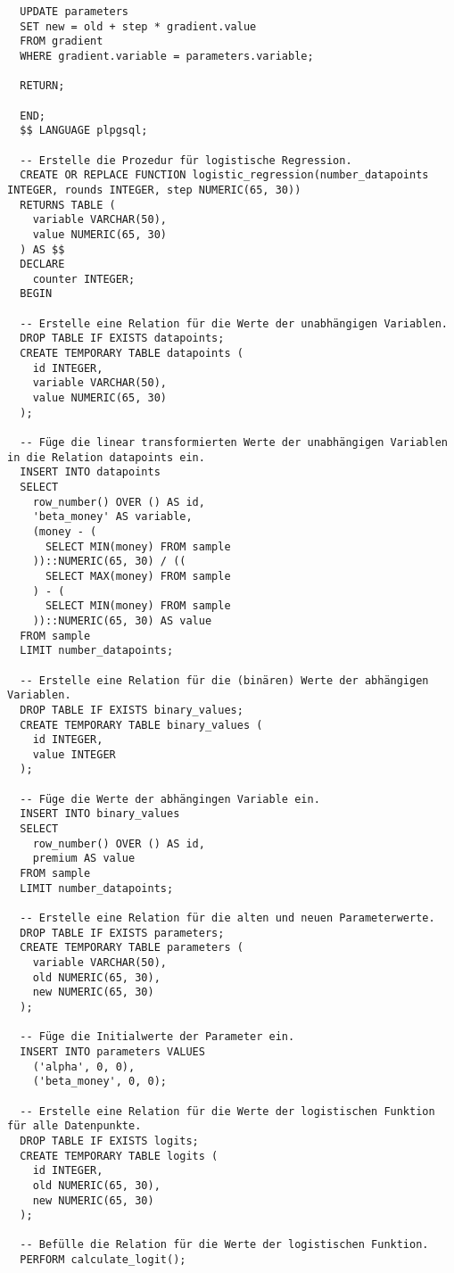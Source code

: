 \begin{verbatim}
  UPDATE parameters
  SET new = old + step * gradient.value
  FROM gradient
  WHERE gradient.variable = parameters.variable;

  RETURN;

  END;
  $$ LANGUAGE plpgsql;

  -- Erstelle die Prozedur für logistische Regression.
  CREATE OR REPLACE FUNCTION logistic_regression(number_datapoints INTEGER, rounds INTEGER, step NUMERIC(65, 30))
  RETURNS TABLE (
    variable VARCHAR(50),
    value NUMERIC(65, 30)
  ) AS $$
  DECLARE
    counter INTEGER;
  BEGIN

  -- Erstelle eine Relation für die Werte der unabhängigen Variablen.
  DROP TABLE IF EXISTS datapoints;
  CREATE TEMPORARY TABLE datapoints (
    id INTEGER,
    variable VARCHAR(50),
    value NUMERIC(65, 30)
  );

  -- Füge die linear transformierten Werte der unabhängigen Variablen in die Relation datapoints ein.
  INSERT INTO datapoints
  SELECT
    row_number() OVER () AS id,
    'beta_money' AS variable,
    (money - (
      SELECT MIN(money) FROM sample
    ))::NUMERIC(65, 30) / ((
      SELECT MAX(money) FROM sample
    ) - (
      SELECT MIN(money) FROM sample
    ))::NUMERIC(65, 30) AS value
  FROM sample
  LIMIT number_datapoints;

  -- Erstelle eine Relation für die (binären) Werte der abhängigen Variablen.
  DROP TABLE IF EXISTS binary_values;
  CREATE TEMPORARY TABLE binary_values (
    id INTEGER,
    value INTEGER
  );

  -- Füge die Werte der abhängingen Variable ein.
  INSERT INTO binary_values
  SELECT
    row_number() OVER () AS id,
    premium AS value
  FROM sample
  LIMIT number_datapoints;

  -- Erstelle eine Relation für die alten und neuen Parameterwerte.
  DROP TABLE IF EXISTS parameters;
  CREATE TEMPORARY TABLE parameters (
    variable VARCHAR(50),
    old NUMERIC(65, 30),
    new NUMERIC(65, 30)
  );

  -- Füge die Initialwerte der Parameter ein.
  INSERT INTO parameters VALUES
    ('alpha', 0, 0),
    ('beta_money', 0, 0);

  -- Erstelle eine Relation für die Werte der logistischen Funktion für alle Datenpunkte.
  DROP TABLE IF EXISTS logits;
  CREATE TEMPORARY TABLE logits (
    id INTEGER,
    old NUMERIC(65, 30),
    new NUMERIC(65, 30)
  );

  -- Befülle die Relation für die Werte der logistischen Funktion.
  PERFORM calculate_logit();


\end{verbatim}
